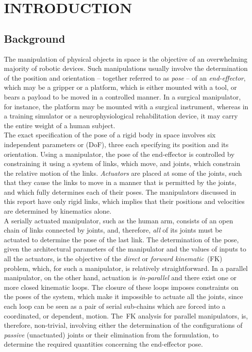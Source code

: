 \documentclass[DD]{iitmdiss}
\newcommand{\mlabel}[1]{\label{#1}}
\begin{document}
\pagebreak
\clearpage

\chapter{INTRODUCTION} \mlabel{ch:intro}
%
\section{Background}
The manipulation of physical objects in space is the objective of an overwhelming majority of robotic devices. Such manipulations usually involve the determination of the position and orientation -- together referred to as \emph{pose} -- of an \emph{end-effector}, which may be a gripper or a platform, which is either mounted with a tool, or bears a payload to be moved in a controlled manner. In a surgical manipulator, for instance, the platform may be mounted with a surgical instrument, whereas in a training simulator or a neurophysiological rehabilitation device, it may carry the entire weight of a human subject.\\
The exact specification of the pose of a rigid body in space involves six independent parameters or \emph{\dofs} (DoF), three each specifying its position and its orientation. Using a manipulator, the pose of the end-effector is controlled by constraining it using a system of links, which move, and joints, which constrain the relative motion of the links. \emph{Actuators} are placed at some of the joints, such that they cause the links to move in a manner that is permitted by the joints, and which fully determines each of their poses. The manipulators discussed in this report have only rigid links, which implies that their positions and velocities are determined by kinematics alone. \\
A serially actuated manipulator, such as the human arm, consists of an open chain of links connected by joints, and, therefore, \emph{all} of its joints must be actuated to determine the pose of the last link. The determination of the pose, given the architectural parameters of the manipulator and the values of inputs to all the actuators, is the objective of the \emph{direct} or \emph{forward kinematic}~(FK) problem, which, for such a manipulator, is relatively straightforward. In a parallel manipulator, on the other hand, actuation is \emph{in-parallel} and there exist one or more closed kinematic loops. The closure of these loops imposes constraints on the poses of the system, which make it impossible to actuate all the joints, since each loop can be seen as a pair of serial sub-chains which are forced into a coordinated, or dependent, motion. The~FK analysis for parallel manipulators, is, therefore, non-trivial, involving either the determination of the configurations of \emph{passive} (unactuated) joints or their elimination from the formulation, to determine the required quantities concerning the end-effector pose.\\
\end{document}
